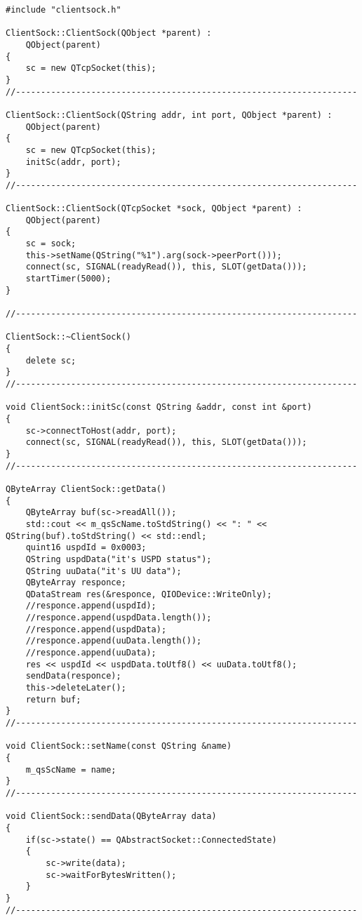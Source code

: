 \begin{lstlisting}
#include "clientsock.h"

ClientSock::ClientSock(QObject *parent) :
    QObject(parent)
{
    sc = new QTcpSocket(this);
}
//--------------------------------------------------------------------

ClientSock::ClientSock(QString addr, int port, QObject *parent) :
    QObject(parent)
{
    sc = new QTcpSocket(this);
    initSc(addr, port);
}
//--------------------------------------------------------------------

ClientSock::ClientSock(QTcpSocket *sock, QObject *parent) :
    QObject(parent)
{
    sc = sock;
    this->setName(QString("%1").arg(sock->peerPort()));
    connect(sc, SIGNAL(readyRead()), this, SLOT(getData()));
    startTimer(5000);
}

//--------------------------------------------------------------------

ClientSock::~ClientSock()
{
    delete sc;
}
//--------------------------------------------------------------------

void ClientSock::initSc(const QString &addr, const int &port)
{
    sc->connectToHost(addr, port);
    connect(sc, SIGNAL(readyRead()), this, SLOT(getData()));
}
//--------------------------------------------------------------------

QByteArray ClientSock::getData()
{
    QByteArray buf(sc->readAll());
    std::cout << m_qsScName.toStdString() << ": " << QString(buf).toStdString() << std::endl;
    quint16 uspdId = 0x0003;
    QString uspdData("it's USPD status");
    QString uuData("it's UU data");
    QByteArray responce;
    QDataStream res(&responce, QIODevice::WriteOnly);
    //responce.append(uspdId);
    //responce.append(uspdData.length());
    //responce.append(uspdData);
    //responce.append(uuData.length());
    //responce.append(uuData);
    res << uspdId << uspdData.toUtf8() << uuData.toUtf8();
    sendData(responce);
    this->deleteLater();
    return buf;
}
//--------------------------------------------------------------------

void ClientSock::setName(const QString &name)
{
    m_qsScName = name;
}
//--------------------------------------------------------------------

void ClientSock::sendData(QByteArray data)
{
    if(sc->state() == QAbstractSocket::ConnectedState)
    {
        sc->write(data);
        sc->waitForBytesWritten();
    }
}
//--------------------------------------------------------------------


\end{lstlisting}

